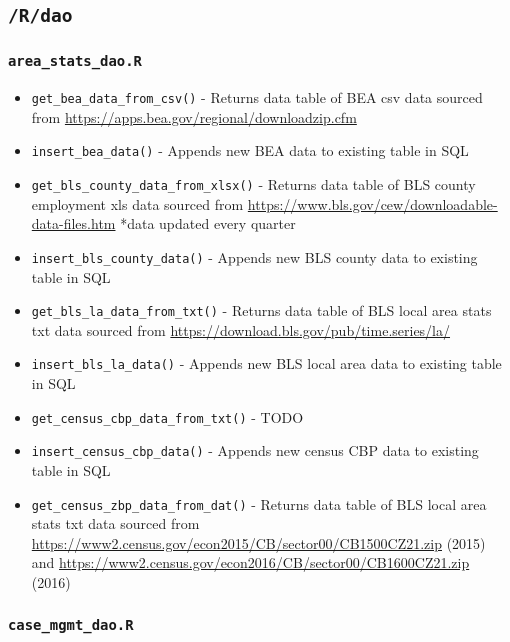 \documentclass[
]{book}
\providecommand{\tightlist}{%
  \setlength{\itemsep}{0pt}\setlength{\parskip}{0pt}}
\begin{document}
\hypertarget{rdao}{%
\subsection{\texorpdfstring{\texttt{/R/dao}}{/R/dao}}\label{rdao}}

\hypertarget{area_stats_dao.r}{%
\subsubsection{\texorpdfstring{\texttt{area\_stats\_dao.R}}{area\_stats\_dao.R}}\label{area_stats_dao.r}}

\begin{itemize}
\tightlist
\item
  \texttt{get\_bea\_data\_from\_csv()} - Returns data table of BEA csv data sourced from \url{https://apps.bea.gov/regional/downloadzip.cfm}
\item
  \texttt{insert\_bea\_data()} - Appends new BEA data to existing table in SQL
\item
  \texttt{get\_bls\_county\_data\_from\_xlsx()} - Returns data table of BLS county employment xls data sourced from \url{https://www.bls.gov/cew/downloadable-data-files.htm} *data updated every quarter
\item
  \texttt{insert\_bls\_county\_data()} - Appends new BLS county data to existing table in SQL
\item
  \texttt{get\_bls\_la\_data\_from\_txt()} - Returns data table of BLS local area stats txt data sourced from \url{https://download.bls.gov/pub/time.series/la/}
\item
  \texttt{insert\_bls\_la\_data()} - Appends new BLS local area data to existing table in SQL
\item
  \texttt{get\_census\_cbp\_data\_from\_txt()} - TODO
\item
  \texttt{insert\_census\_cbp\_data()} - Appends new census CBP data to existing table in SQL
\item
  \texttt{get\_census\_zbp\_data\_from\_dat()} - Returns data table of BLS local area stats txt data sourced from \url{https://www2.census.gov/econ2015/CB/sector00/CB1500CZ21.zip} (2015) and \url{https://www2.census.gov/econ2016/CB/sector00/CB1600CZ21.zip} (2016)
\end{itemize}

\hypertarget{case_mgmt_dao.r}{%
\subsubsection{\texorpdfstring{\texttt{case\_mgmt\_dao.R}}{case\_mgmt\_dao.R}}\label{case_mgmt_dao.r}}
\end{document}
